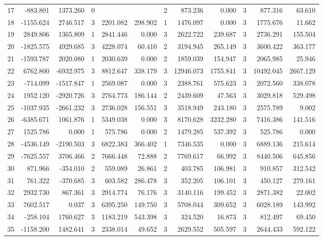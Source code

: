 \begin{table}[ht]
\begin{tabular}{lrrrrrrrrrrr}
17 & -883.801 & 1373.260 & 0 &  &  & 2 & 873.236 & 0.000 & 3 & 877.316 & 63.610 \\
18 & -1155.624 & 2746.517 & 3 & 2201.082 & 298.902 & 1 & 1476.097 & 0.000 & 3 & 1775.676 & 11.662 \\
19 & 2849.806 & 1365.809 & 1 & 2841.446 & 0.000 & 3 & 2622.722 & 239.687 & 3 & 2736.291 & 155.504 \\
20 & -1825.575 & 4929.685 & 3 & 4228.074 & 60.410 & 2 & 3194.945 & 265.149 & 3 & 3600.422 & 363.177 \\
21 & -1593.787 & 2020.080 & 1 & 2030.639 & 0.000 & 2 & 1859.039 & 154.947 & 3 & 2065.985 & 25.946 \\
22 & 6762.800 & -6932.975 & 3 & 8812.647 & 338.179 & 3 & 12946.073 & 1755.841 & 3 & 10492.045 & 2667.129 \\
23 & -714.099 & -1517.847 & 1 & 2569.087 & 0.000 & 3 & 2388.761 & 575.623 & 3 & 2072.560 & 338.078 \\
24 & 1952.120 & -2920.726 & 3 & 2764.773 & 186.144 & 2 & 2439.609 & 47.563 & 3 & 3029.818 & 529.498 \\
25 & -1037.935 & -2661.232 & 3 & 2736.028 & 156.551 & 3 & 3518.949 & 243.180 & 3 & 2575.789 & 9.002 \\
26 & -6385.671 & 1061.876 & 1 & 5349.038 & 0.000 & 3 & 8170.628 & 3232.280 & 3 & 7416.386 & 141.516 \\
27 & 1525.786 & 0.000 & 1 & 575.786 & 0.000 & 2 & 1479.285 & 537.392 & 3 & 525.786 & 0.000 \\
28 & -4536.149 & -2190.503 & 3 & 6822.383 & 366.402 & 1 & 7346.535 & 0.000 & 3 & 6889.136 & 215.614 \\
29 & -7625.557 & 3706.466 & 2 & 7666.448 & 72.888 & 2 & 7769.617 & 66.992 & 3 & 8440.506 & 645.856 \\
30 & 871.966 & -354.010 & 2 & 559.089 & 26.861 & 2 & 403.785 & 106.981 & 3 & 910.857 & 312.542 \\
31 & 761.322 & -370.685 & 3 & 603.582 & 286.478 & 3 & 352.205 & 106.101 & 3 & 450.127 & 279.161 \\
32 & 2932.730 & 867.361 & 3 & 2914.774 & 76.176 & 3 & 3140.116 & 199.452 & 3 & 2871.382 & 22.002 \\
33 & 7602.517 & 0.037 & 3 & 6395.250 & 149.750 & 3 & 5708.044 & 309.652 & 3 & 6028.189 & 143.992 \\
34 & -258.104 & 1760.627 & 3 & 1183.219 & 543.398 & 3 & 324.520 & 16.873 & 3 & 812.497 & 69.450 \\
35 & -1158.200 & 1482.641 & 3 & 2338.014 & 49.652 & 3 & 2629.552 & 505.597 & 3 & 2644.433 & 592.122 \\

\end{tabular}
\end{table}
